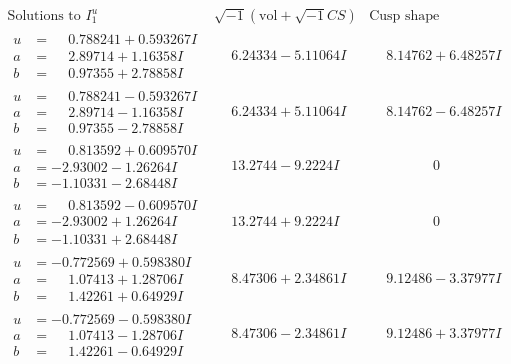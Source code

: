\documentclass[1p]{elsarticle_modified}
\theoremstyle{definition}
\newcommand{\I}{\sqrt{-1}}
\begin{document}
$$\begin{array}{c|c|c}  
\text{Solutions to }I^u_{1}& \I (\text{vol} + \sqrt{-1}CS) & \text{Cusp shape}\\
 \hline 
\begin{aligned}
u &= \phantom{-}0.788241 + 0.593267 I \\
a &= \phantom{-}2.89714 + 1.16358 I \\
b &= \phantom{-}0.97355 + 2.78858 I\end{aligned}
 & \phantom{-}6.24334 - 5.11064 I & \phantom{-}8.14762 + 6.48257 I \\ \hline\begin{aligned}
u &= \phantom{-}0.788241 - 0.593267 I \\
a &= \phantom{-}2.89714 - 1.16358 I \\
b &= \phantom{-}0.97355 - 2.78858 I\end{aligned}
 & \phantom{-}6.24334 + 5.11064 I & \phantom{-}8.14762 - 6.48257 I \\ \hline\begin{aligned}
u &= \phantom{-}0.813592 + 0.609570 I \\
a &= -2.93002 - 1.26264 I \\
b &= -1.10331 - 2.68448 I\end{aligned}
 & \phantom{-}13.2744 - 9.2224 I & \phantom{-0.000000 } 0 \\ \hline\begin{aligned}
u &= \phantom{-}0.813592 - 0.609570 I \\
a &= -2.93002 + 1.26264 I \\
b &= -1.10331 + 2.68448 I\end{aligned}
 & \phantom{-}13.2744 + 9.2224 I & \phantom{-0.000000 } 0 \\ \hline\begin{aligned}
u &= -0.772569 + 0.598380 I \\
a &= \phantom{-}1.07413 + 1.28706 I \\
b &= \phantom{-}1.42261 + 0.64929 I\end{aligned}
 & \phantom{-}8.47306 + 2.34861 I & \phantom{-}9.12486 - 3.37977 I \\ \hline\begin{aligned}
u &= -0.772569 - 0.598380 I \\
a &= \phantom{-}1.07413 - 1.28706 I \\
b &= \phantom{-}1.42261 - 0.64929 I\end{aligned}
 & \phantom{-}8.47306 - 2.34861 I & \phantom{-}9.12486 + 3.37977 I \\ \hline\begin{aligned}

\end{aligned}
\end{array}$$
\end{document}
